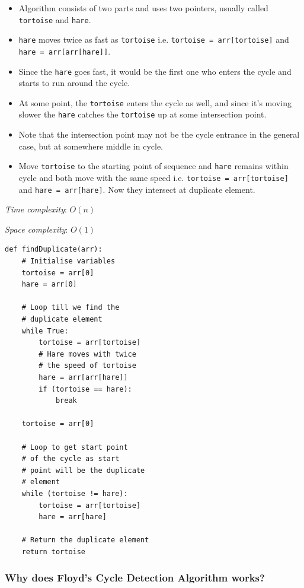 \documentclass[a4paper,11pt]{book}
\begin{document}
\begin{itemize}

\item Algorithm consists of two parts and uses two pointers, usually called \lstinline{tortoise} and \lstinline{hare}.
\item \lstinline{hare} moves twice as fast as \lstinline{tortoise} i.e. \lstinline{tortoise = arr[tortoise]} and \lstinline{hare = arr[arr[hare]]}.
\item Since the \lstinline{hare} goes fast, it would be the first one who enters the cycle and starts to run around the cycle.
\item At some point, the \lstinline{tortoise} enters the cycle as well, and since it’s moving slower the \lstinline{hare} catches the \lstinline{tortoise} up at some intersection point.
\item Note that the intersection point may not be the cycle entrance in the general case, but at somewhere middle in cycle.
\item Move \lstinline{tortoise} to the starting point of sequence and \lstinline{hare} remains within cycle and both move with the same speed i.e. \lstinline{tortoise = arr[tortoise]} and \lstinline{hare = arr[hare]}. Now they intersect at duplicate element.

\end{itemize}

\noindent \textit{Time complexity}: $O(n)$

\noindent \textit{Space complexity}: $O(1)$

\newpage
\begin{lstlisting}
def findDuplicate(arr):
    # Initialise variables
    tortoise = arr[0]
    hare = arr[0]

    # Loop till we find the
    # duplicate element
    while True:
        tortoise = arr[tortoise]
        # Hare moves with twice
        # the speed of tortoise
        hare = arr[arr[hare]]
        if (tortoise == hare):
            break

    tortoise = arr[0]

    # Loop to get start point
    # of the cycle as start
    # point will be the duplicate
    # element
    while (tortoise != hare):
        tortoise = arr[tortoise]
        hare = arr[hare]

    # Return the duplicate element
    return tortoise
\end{lstlisting}

\subsubsection{Why does Floyd's Cycle Detection Algorithm works?}
\end{document}
